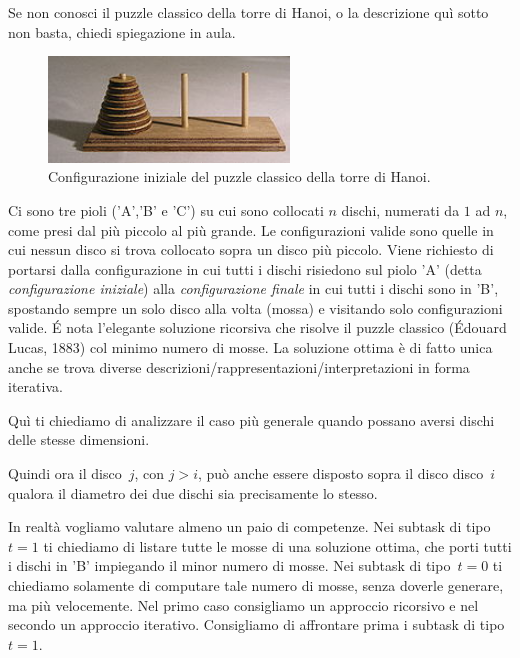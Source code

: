 \renewcommand{\nomebreve}{hanoi\_equal\_disks}
\renewcommand{\titolo}{The Hanoi puzzle with equal disks}

\introduzione{}

Se non conosci il puzzle classico della torre di Hanoi, o la descrizione quì sotto non basta, chiedi spiegazione in aula.

\begin{figure}[h!]
\begin{center}
  \noindent \includegraphics[width=0.57\textwidth]{figures/220px-Tower_of_Hanoi.jpeg}
\end{center}
\caption{Configurazione iniziale del puzzle classico della torre di Hanoi.}
\end{figure}

Ci sono tre pioli ('A','B' e 'C') su cui sono collocati $n$ dischi, numerati da $1$ ad $n$, come presi dal più piccolo al più grande. Le configurazioni valide sono quelle in cui nessun disco si trova collocato sopra un disco più piccolo.
Viene richiesto di portarsi dalla configurazione in cui tutti i dischi risiedono sul piolo 'A' (detta \emph{configurazione iniziale}) alla \emph{configurazione finale} in cui tutti i dischi sono in 'B', spostando sempre un solo disco alla volta (mossa) e visitando solo configurazioni valide.
\'E nota l'elegante soluzione ricorsiva che risolve il puzzle classico (Édouard Lucas, 1883) col minimo numero di mosse. La soluzione ottima è di fatto unica anche se trova diverse descrizioni/rappresentazioni/interpretazioni in forma iterativa.

\begin{center}
\end{center}

Quì ti chiediamo di analizzare il caso più generale quando possano aversi dischi delle stesse dimensioni.

Quindi ora il disco~$j$, con $j>i$, può anche essere disposto sopra il disco disco~$i$ qualora il diametro dei due dischi sia precisamente lo stesso.

In realtà vogliamo valutare almeno un paio di competenze. Nei subtask di tipo~$t=1$ ti chiediamo di listare tutte le mosse di una soluzione ottima, che porti tutti i dischi in 'B' impiegando il minor numero di mosse.
Nei subtask di tipo~$t=0$ ti chiediamo solamente di computare tale numero di mosse, senza doverle generare, ma più velocemente.
Nel primo caso consigliamo un approccio ricorsivo e nel secondo un approccio iterativo.
Consigliamo di affrontare prima i subtask di tipo~$t=1$.


